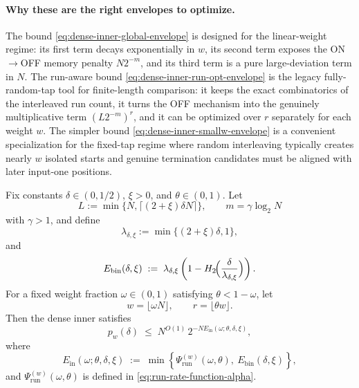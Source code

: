 \paragraph{Why these are the right envelopes to optimize.}
The bound \eqref{eq:dense-inner-global-envelope} is designed for the linear-weight regime:
its first term decays exponentially in $w$, its second term exposes the ON$\to$OFF memory penalty $N2^{-m}$,
and its third term is a pure large-deviation term in $N$.
The run-aware bound \eqref{eq:dense-inner-run-opt-envelope} is the legacy fully-random-tap tool for finite-length
comparison:
it keeps the exact combinatorics of the interleaved run count,
it turns the OFF mechanism into the genuinely multiplicative term $(L2^{-m})^r$,
and it can be optimized over $r$ separately for each weight $w$.
The simpler bound \eqref{eq:dense-inner-smallw-envelope} is a convenient specialization for
the fixed-tap regime where random interleaving typically creates nearly \(w\) isolated starts and genuine termination
candidates must be aligned with later input-one positions.

\begin{theorem}
\label{prop:dense-inner-linear-exponent}
Fix constants $\delta\in(0,1/2)$, $\xi>0$, and $\theta\in(0,1)$.
Let
\[
L:=\min\{N,\lceil(2+\xi)\delta N\rceil\},
\qquad
m=\gamma\log_2 N
\]
with $\gamma>1$, and define
\[
\lambda_{\delta,\xi}
:=
\min\{(2+\xi)\delta,1\},
\]
and
\begin{equation}
\label{eq:dense-inner-binomial-exponent}
E_{\mathrm{bin}}(\delta,\xi)
\;:=\;
\lambda_{\delta,\xi}
\left(1-H_2\!\Bigl(\frac{\delta}{\lambda_{\delta,\xi}}\Bigr)\right).
\end{equation}
For a fixed weight fraction $\omega\in(0,1)$ satisfying $\theta<1-\omega$, let
\[
w=\lfloor \omega N\rfloor,
\qquad
r=\lfloor \theta w\rfloor.
\]
Then the dense inner satisfies
\begin{equation}
\label{eq:dense-inner-linear-exponent}
p_w(\delta)
\;\le\;
N^{O(1)}\,
2^{-N E_{\mathrm{in}}(\omega;\theta,\delta,\xi)},
\end{equation}
where
\begin{equation}
\label{eq:dense-inner-linear-rate-function}
E_{\mathrm{in}}(\omega;\theta,\delta,\xi)
\;:=\;
\min\!\left\{
\Psi_{\mathrm{run}}^{(w)}(\omega,\theta),\
E_{\mathrm{bin}}(\delta,\xi)
\right\},
\end{equation}
and $\Psi_{\mathrm{run}}^{(w)}(\omega,\theta)$ is defined in
\eqref{eq:run-rate-function-alpha}.
\end{theorem}

